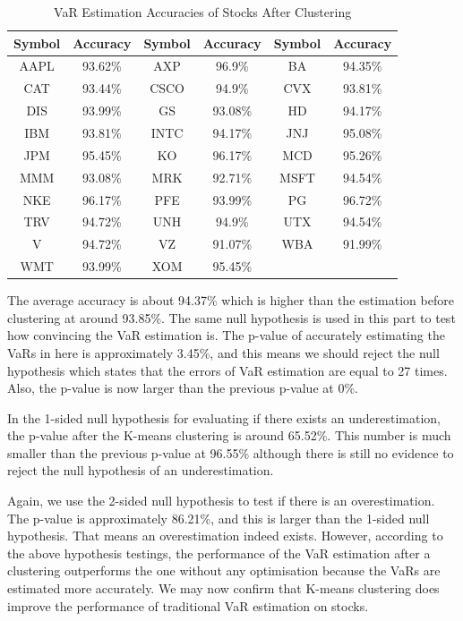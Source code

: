 \documentclass[11pt]{article} %
\theoremstyle{plain}
\theoremstyle{definition}
\begin{document}
{
  \begin{table}[ht]
    \centering
    \small
    \begin{tabular}{|c|c|c|c|c|c|}
        \hline
        Symbol & Accuracy & Symbol & Accuracy & Symbol & Accuracy \\
        \hline
        AAPL & \color{red}93.62\% & AXP & \color{red}96.9\% & BA & \color{red}94.35\% \\
        CAT & 93.44\% & CSCO & \color{red}94.9\% & CVX & 93.81\% \\
        DIS & \color{red}93.99\% & GS & 93.08\% & HD & \color{red}94.17\% \\
        IBM & 93.81\% & INTC & \color{red}94.17\% & JNJ & \color{red}95.08\% \\
        JPM & \color{red}95.45\% & KO & \color{red}96.17\% & MCD & \color{red}95.26\% \\
        MMM & 93.08\% & MRK & 92.71\% & MSFT & \color{red}94.54\% \\
        NKE & \color{red}96.17\% & PFE & 93.99\% & PG & \color{red}96.72\% \\
        TRV & \color{red}94.72\% & UNH & \color{red}94.9\% & UTX & \color{red}94.54\% \\
        V & \color{red}94.72\% & VZ & 91.07\% & WBA & 91.99\% \\
        WMT & 93.99\% & XOM & \color{red}95.45\% & & \\
        \hline
    \end{tabular}
    \caption{VaR Estimation Accuracies of Stocks After Clustering}
    \label{table:accstockafter}
  \end{table}
}

The average accuracy is about 94.37\% which is higher than the estimation before clustering at around 93.85\%. The same null hypothesis is used in this part to test how convincing the VaR estimation is. The p-value of accurately estimating the VaRs in here is approximately 3.45\%, and this means we should reject the null hypothesis which states that the errors of VaR estimation are equal to 27 times. Also, the p-value is now larger than the previous p-value at 0\%.

In the 1-sided null hypothesis for evaluating if there exists an underestimation, the p-value after the K-means clustering is around 65.52\%. This number is much smaller than the previous p-value at 96.55\% although there is still no evidence to reject the null hypothesis of an underestimation.

Again, we use the 2-sided null hypothesis to test if there is an overestimation. The p-value is approximately 86.21\%, and this is larger than the 1-sided null hypothesis. That means an overestimation indeed exists. However, according to the above hypothesis testings, the performance of the VaR estimation after a clustering outperforms the one without any optimisation because the VaRs are estimated more accurately. We may now confirm that K-means clustering does improve the performance of traditional VaR estimation on stocks.
\end{document}
